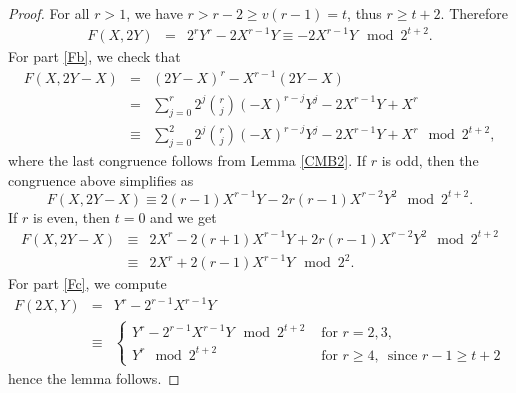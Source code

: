 \documentclass[11pt, reqno]{amsart}
\numberwithin{equation}{section}
\theoremstyle{definition}
\theoremstyle{remark}
\theoremstyle{definition}
\theoremstyle{remark}
\theoremstyle{remark}
\begin{document}
\begin{proof}
For all $r>1$, we have $r>r-2\geq v(r-1)=t$, thus $r\geq t+2$. Therefore
\begin{eqnarray*}
   F(X,2Y)& = &2^{r}Y^{r}-2X^{r-1}Y \equiv -2X^{r-1}Y \mod 2^{t+2}.\end{eqnarray*}
   For part \ref{Fb}, we check that
   \begin{eqnarray*}
   F(X,2Y-X)& =& (2Y-X)^{r}-X^{r-1}(2Y-X)\\
    \label{F(X,2Y-X)}
            &=& \sum_{j=0}^{r}2^j{r \choose j}(-X)^{r-j}Y^{j}-2X^{r-1}Y+ X^{r}\\
            &\equiv & \sum_{j=0}^{2}2^{j}{r \choose j}(-X)^{r-j}Y^{j}-2X^{r-1}Y+ X^{r}\mod 2^{t+2},
\end{eqnarray*}
 where the last congruence follows from Lemma \ref{CMB2}.  
 If $r$ is odd, then the congruence above simplifies as
 $$F(X, 2Y-X)\equiv  2(r-1)X^{r-1}Y -2r(r-1)X^{r-2}Y^{2} \mod 2^{t+2}.
$$
 If $r$ is even, then $t=0$ and we get
\begin{eqnarray*}             
F(X, 2Y-X)&\equiv & 2X^{r}-2(r+1)X^{r-1}Y + 2r(r-1)X^{r-2}Y^{2}\mod 2^{t+2}\\
&\equiv& 2X^{r}+ 2(r-1)X^{r-1}Y \mod 2^{2}.
\end{eqnarray*}
For part \ref{Fc}, we compute
\begin{eqnarray*}
    F(2X,Y)	&= &Y^{r}-2^{r-1}X^{r-1}Y\\
  &\equiv&\begin{cases} Y^{r}-2^{r-1}X^{r-1}Y \mod 2^{t+2} &\text{ for } r=2,3,\\
  Y^{r}\mod 2^{t+2} &\text{ for } r \geq 4,\, \text{ since } r-1\geq t+2
   \end{cases}
\end{eqnarray*}
hence the lemma follows.
\end{proof}
 
\end{document}
